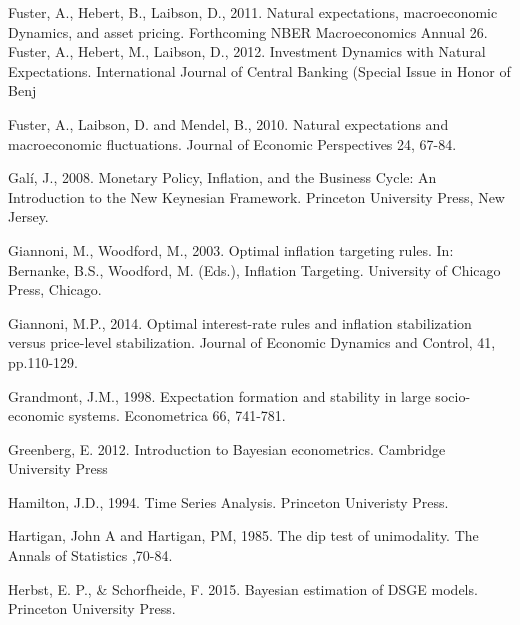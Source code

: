 \begin{thebibliography}{}
\bibitem{}
Fuster, A., Hebert, B., Laibson, D., 2011. Natural expectations,
macroeconomic Dynamics, and asset pricing. Forthcoming NBER
Macroeconomics Annual 26.
\bibitem{}
Fuster, A., Hebert, M., Laibson, D., 2012. Investment Dynamics with
Natural Expectations. International Journal of Central Banking
(Special Issue in Honor of Benj










Fuster, A., Laibson, D. and Mendel, B., 2010. Natural expectations
and macroeconomic fluctuations. Journal of Economic Perspectives 24,
67-84.


Gal\'{i}, J., 2008. Monetary Policy, Inflation, and the Business Cycle: An Introduction to the New Keynesian Framework. Princeton University Press, New Jersey.

\bibitem{}Giannoni, M., Woodford, M., 2003. Optimal inflation targeting rules.
In: Bernanke, B.S., Woodford, M. (Eds.), Inflation Targeting.
University of Chicago Press, Chicago.

\bibitem{}Giannoni, M.P., 2014. Optimal interest-rate rules and inflation stabilization versus price-level stabilization. 
Journal of Economic Dynamics and Control, 41, pp.110-129.

Grandmont, J.M., 1998. Expectation formation and stability in large
socio-economic systems. Econometrica 66, 741-781.

\bibitem{} Greenberg, E. 2012. Introduction to Bayesian econometrics. Cambridge University Press



Hamilton, J.D., 1994. Time Series Analysis. Princeton
Univeristy Press.

 Hartigan, John A and Hartigan, PM, 1985.
The dip test of unimodality.
{The Annals of Statistics} ,70-84.

\bibitem{} Herbst, E. P., \& Schorfheide, F. 2015. Bayesian estimation of DSGE models. Princeton University Press.



\end{thebibliography}
